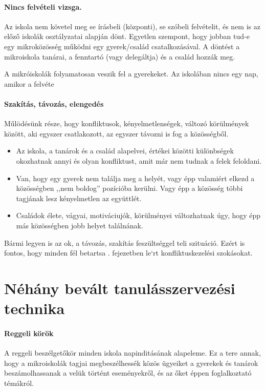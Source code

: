 \paragraph{Nincs felvételi vizsga.}
Az iskola nem követel meg se írásbeli (központi), se szóbeli
felvételit, és nem is az előző iskolák osztályzatai alapján dönt. Egyetlen
szempont, hogy jobban tud-e egy mikroközösség működni egy gyerek/család
csatalkozásával. A döntést a mikroiskola tanárai, a fenntartó (vagy
delegáltja) és a család hozzák meg.

A mikróiskolák folyamatosan veszik fel a gyerekeket. Az iskolában nincs egy nap, amikor a felvéte

\paragraph{Szakítás, távozás, elengedés}
Műlödésünk része, hogy konfliktusok, kényelmetlenségek, változó körülmények
között, aki egyszer csatlakozott, az egyszer távozni is fog a közösségből.
\begin{itemize}
      \item Az iskola, a tanárok és a család alapelvei, értékei közötti
            különbségek okozhatnak annyi és olyan konfliktust, amit már nem
            tudnak a felek
            feloldani.
      \item Van, hogy egy gyerek nem találja meg a helyét, vagy épp valamiért
            elkezd a közösségben ,,nem boldog'' pozícióba kerülni. Vagy épp a
            közösség
            többi tagjának lesz kényelmetlen az együttlét.
      \item Családok élete, vágyai, motiváciujók, körülményei változhatnak úgy,
            hogy épp más közösségben jobb helyet találnának.
\end{itemize}

Bármi legyen is az ok, a távozás, szakítás feszültséggel teli szituáció. Ezért
is fontos, hogy minden fél betartsa  .
fejezetben le`rt konfliktuskezelési szokásokat.



\section{Néhány bevált tanulásszervezési technika}
\paragraph{Reggeli körök}
A reggeli
beszélgetőkör minden iskola napinditásának alapeleme. Ez a tere annak,
hogy a mikroiskolák tagjai megbeszélhessék közös ügyeiket a gyerekek és tanárok
beszámolhassanak a velük történt eseményekről, és az őket éppen foglalkoztató
témákról.
